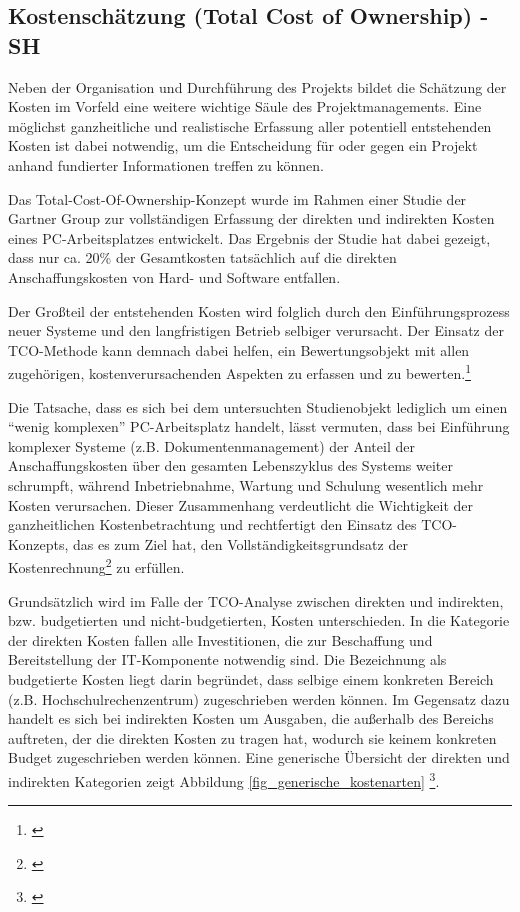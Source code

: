 
\subsection{Kostenschätzung (Total Cost of Ownership) - SH}

\label{subsection_kostenschatzung_TCO}
Neben der Organisation und Durchführung des Projekts bildet die Schätzung der Kosten im Vorfeld 
eine weitere wichtige Säule des Projektmanagements. Eine möglichst ganzheitliche und realistische 
Erfassung aller potentiell entstehenden Kosten ist dabei notwendig, um die Entscheidung für oder 
gegen ein Projekt anhand fundierter Informationen treffen zu können.

Das Total-Cost-Of-Ownership-Konzept wurde im Rahmen einer Studie der Gartner Group 
zur vollständigen Erfassung der direkten und indirekten Kosten eines PC-Arbeitsplatzes 
entwickelt. Das Ergebnis der Studie hat dabei gezeigt, dass nur ca. 20\% der Gesamtkosten 
tatsächlich auf die direkten Anschaffungskosten von Hard- und Software entfallen. 

Der Großteil der entstehenden Kosten wird folglich durch den Einführungsprozess neuer 
Systeme und den langfristigen Betrieb selbiger verursacht. Der Einsatz der TCO-Methode 
kann demnach dabei helfen, ein Bewertungsobjekt mit allen zugehörigen, 
kostenverursachenden Aspekten zu erfassen und zu bewerten.\footnote{\cite{hansen_business_2009}}

Die Tatsache, dass es sich bei dem untersuchten Studienobjekt lediglich um einen “wenig komplexen” PC-Arbeitsplatz handelt, lässt vermuten, dass bei Einführung komplexer Systeme (z.B. Dokumentenmanagement) der Anteil der Anschaffungskosten über den gesamten Lebenszyklus des Systems weiter schrumpft, während Inbetriebnahme, Wartung und Schulung wesentlich mehr Kosten verursachen. Dieser Zusammenhang verdeutlicht die Wichtigkeit der ganzheitlichen Kostenbetrachtung und rechtfertigt den Einsatz des TCO-Konzepts, das es zum Ziel hat, den Vollständigkeitsgrundsatz der Kostenrechnung\footnote{\cite{grob_einfuhrung_2004}} zu erfüllen.

Grundsätzlich wird im Falle der TCO-Analyse zwischen direkten und indirekten, bzw. budgetierten und nicht-budgetierten, Kosten unterschieden. In die Kategorie der direkten Kosten fallen alle Investitionen, die zur Beschaffung und Bereitstellung der IT-Komponente notwendig sind. Die Bezeichnung als budgetierte Kosten liegt darin begründet, dass selbige einem konkreten Bereich (z.B. Hochschulrechenzentrum) zugeschrieben werden können. Im Gegensatz dazu handelt es sich bei indirekten Kosten um Ausgaben, die außerhalb des Bereichs auftreten, der die direkten Kosten zu tragen hat, wodurch sie keinem konkreten Budget zugeschrieben werden können. Eine generische Übersicht der direkten und indirekten Kategorien zeigt Abbildung \ref{fig_generische_kostenarten} \footnote{\cite{hansen_business_2009}}.

